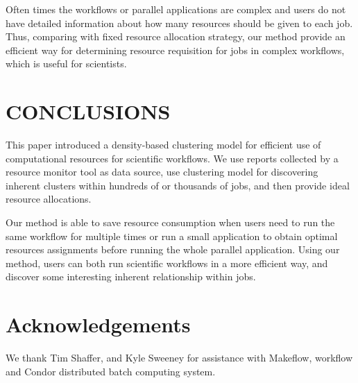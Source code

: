 \documentclass[conference]{IEEEtran}
\begin{document}
Often times the workflows or parallel applications are complex and users do not have detailed information about how many resources should be given to each job. Thus, comparing with fixed resource allocation strategy, our method provide an efficient way for determining resource requisition for jobs in complex workflows, which is useful for scientists.
\section{CONCLUSIONS}

This paper introduced a density-based clustering model for efficient use of computational resources for scientific workflows. We use reports collected by a resource monitor tool as data source, use clustering model for discovering inherent clusters within hundreds of or thousands of jobs, and then provide ideal resource allocations. 

Our method is able to save resource consumption when users need to run the same workflow for multiple times or run a small application to obtain optimal resources assignments before running the whole parallel application. Using our method, users can both run scientific workflows in a more efficient way, and discover some interesting inherent relationship within jobs.

\section{Acknowledgements}
We thank Tim Shaffer, and Kyle Sweeney for assistance with Makeflow, workflow and Condor distributed batch computing system.
\end{document}
